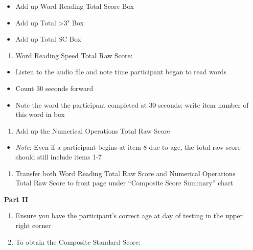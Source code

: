 \documentclass[]{book}
\providecommand{\tightlist}{%
  \setlength{\itemsep}{0pt}\setlength{\parskip}{0pt}}
\begin{document}
\begin{itemize}
\tightlist
\item
  Add up Word Reading Total Score Box
\item
  Add up Total \textgreater{}3" Box
\item
  Add up Total SC Box
\end{itemize}

\begin{enumerate}
\def\labelenumi{\arabic{enumi}.}
\setcounter{enumi}{3}
\tightlist
\item
  Word Reading Speed Total Raw Score:
\end{enumerate}

\begin{itemize}
\tightlist
\item
  Listen to the audio file and note time participant began to read words
\item
  Count 30 seconds forward
\item
  Note the word the participant completed at 30 seconds; write item
  number of this word in box
\end{itemize}

\begin{enumerate}
\def\labelenumi{\arabic{enumi}.}
\setcounter{enumi}{4}
\tightlist
\item
  Add up the Numerical Operations Total Raw Score
\end{enumerate}

\begin{itemize}
\tightlist
\item
  \emph{Note}: Even if a participant begins at item 8 due to age, the
  total raw score should still include items 1-7
\end{itemize}

\begin{enumerate}
\def\labelenumi{\arabic{enumi}.}
\setcounter{enumi}{5}
\tightlist
\item
  Transfer both Word Reading Total Raw Score and Numerical Operations
  Total Raw Score to front page under ``Composite Score Summary'' chart
\end{enumerate}

\textbf{Part II}

\begin{enumerate}
\def\labelenumi{\arabic{enumi}.}
\tightlist
\item
  Ensure you have the participant's correct age at day of testing in the
  upper right corner
\item
  To obtain the Composite Standard Score:
\end{enumerate}
\end{document}
